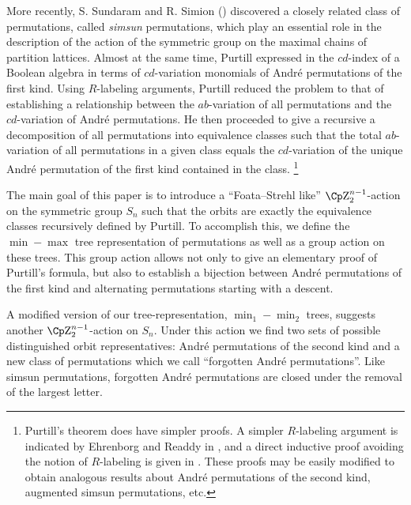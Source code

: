  More recently, S. Sundaram and R. Simion (\cite[p.\ 267]{Sundaram})
discovered a closely related class of permutations, called {\em simsun}
permutations, which play an essential role in the description of the
action of the symmetric group on the maximal chains of partition lattices.
Almost at the same time, Purtill expressed in \cite{pur} the
$cd$-index of a Boolean algebra in terms of $cd$-variation monomials of
Andr\'e permutations of the first kind. Using $R$-labeling arguments, 
Purtill reduced the problem to that of establishing a relationship between 
the $ab$-variation of all permutations and the
$cd$-variation of Andr\'e permutations. He then proceeded to
give a recursive a decomposition of all permutations into equivalence 
classes such that the total $ab$-variation of all permutations in a
given class equals the $cd$-variation of the unique Andr\'e
permutation of the first kind contained in the class.
\footnote{Purtill's theorem does have simpler proofs. A simpler $R$-labeling
argument is indicated by Ehrenborg and Readdy in \cite[Section
3]{Ehrenborg-Readdy}, and a direct inductive proof avoiding the notion
of $R$-labeling is given in \cite{Hetyei}. These proofs may be easily
modified to obtain analogous results about Andr\'e permutations of the
second kind, augmented simsun permutations, etc.}
 
The main goal of this paper is to introduce a ``Foata--Strehl like''
$\Zzz_2^{n-1}$-action on the symmetric group $S_n$ such that the orbits
are exactly the equivalence classes recursively defined by Purtill.
To accomplish this, we define the $\min-\max$ tree representation of
permutations  as well as a group action on these trees. This group
action allows not only to give an elementary proof of Purtill's formula,
but also to establish a bijection between Andr\'e permutations of the
first kind and alternating permutations starting with a descent.

A modified version of our tree-representation, $\min_1-\min_2$
trees, suggests another $\Zzz_2^{n-1}$-action on $S_n$. Under
this action we find two sets of possible distinguished
orbit representatives: Andr\'e permutations of the second kind
and a new class of permutations which we call ``forgotten Andr\'e
permutations''. Like simsun permutations, forgotten Andr\'e permutations
are closed under the removal of the largest letter. 

